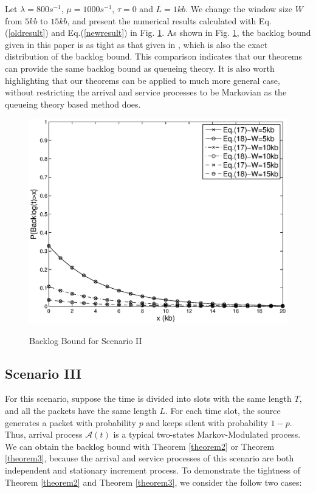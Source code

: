 \documentclass[paper]{ieice}
\begin{document}
Let $\lambda=800s^{-1}$, $\mu=1000s^{-1}$, $\tau=0$ and $L=1kb$. We change the window size $W$ from $5kb$ to $15kb$, and present the numerical results calculated with Eq.(\ref{oldresult}) and Eq.(\ref{newresult}) in Fig. \ref{result3}. As shown in Fig. \ref{result3}, the backlog bound given in this paper is as tight as that given in \cite{jung1996analysis}, which is also the exact distribution of the backlog bound. This comparison indicates that our theorems can provide the same backlog bound as queueing theory. It is also worth highlighting that our theorems can be applied to much more general case, without restricting the arrival and service processes to be Markovian as the queueing theory based method does.
\begin{figure}
  \centering
  \includegraphics[scale=0.45]{figures/backlogcomp.eps}\\
  \caption{Backlog Bound for Scenario II}\label{result3}
\end{figure}

\subsection{Scenario III}
For this scenario, suppose the time is divided into slots with the same length $T$, and all the packets have the same length $L$. For each time slot, the source generates a packet with probability $p$ and keeps silent with probability $1-p$. Thus, arrival process $\mathcal{A}(t)$ is a typical two-states Markov-Modulated process. We can obtain the backlog bound with Theorem \ref{theorem2} or Theorem \ref{theorem3}, because the arrival and service processes of this scenario are both independent and stationary increment process. To demonstrate the tightness of Theorem \ref{theorem2} and Theorem \ref{theorem3}, we consider the follow two cases:
\end{document}
